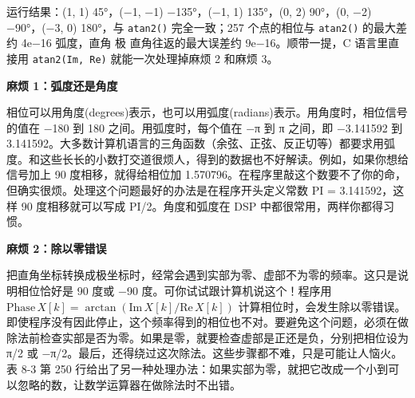 \begin{Shaded}
\begin{Highlighting}[]
 \OperatorTok{(}  \OperatorTok{*}\OperatorTok{,}   \OperatorTok{*}\OperatorTok{,}  \OperatorTok{*}\OperatorTok{,}  \OperatorTok{*}\OperatorTok{)}
\OperatorTok{\{}
     \OperatorTok{(}\OperatorTok{=} \OperatorTok{;}\OperatorTok{\textless{}}\OperatorTok{;}\OperatorTok{++)} \OperatorTok{\{}          
\OperatorTok{[}\OperatorTok{]} \OperatorTok{=}\OperatorTok{[}\OperatorTok{]} \OperatorTok{*}\OperatorTok{(}\OperatorTok{[}\OperatorTok{]);}    
\OperatorTok{[}\OperatorTok{]} \OperatorTok{=}\OperatorTok{[}\OperatorTok{]} \OperatorTok{*}\OperatorTok{(}\OperatorTok{[}\OperatorTok{]);}    
    \OperatorTok{\}}
\OperatorTok{\}}
\end{Highlighting}
\end{Shaded}

运行结果：(1, 1)  45°，(−1, −1)  −135°，(−1, 1)
 135°，(0, 2)  90°，(0, −2)  −90°，(−3, 0)
 180°，与 \texttt{atan2()} 完全一致；257 个点的相位与
\texttt{atan2()} 的最大差约 4e−16 弧度，直角  极 
直角往返的最大误差约 9e−16。顺带一提，C 语言里直接用
\texttt{atan2(Im,\ Re)} 就能一次处理掉麻烦 2 和麻烦 3。

\textbf{麻烦 1：弧度还是角度}

相位可以用角度(degrees)表示，也可以用弧度(radians)表示。用角度时，相位信号的值在
−180 到 180 之间。用弧度时，每个值在 −π 到 π 之间，即 −3.141592 到
3.141592。大多数计算机语言的三角函数（余弦、正弦、反正切等）都要求用弧度。和这些长长的小数打交道很烦人，得到的数据也不好解读。例如，如果你想给信号加上
90 度相移，就得给相位加
1.570796。在程序里敲这个数要不了你的命，但确实很烦。处理这个问题最好的办法是在程序开头定义常数
PI = 3.141592，这样 90 度相移就可以写成 PI/2。角度和弧度在 DSP
中都很常用，两样你都得习惯。

\textbf{麻烦 2：除以零错误}

把直角坐标转换成极坐标时，经常会遇到实部为零、虚部不为零的频率。这只是说明相位恰好是
90 度或 −90 度。可你试试跟计算机说这个！程序用
\(\mathrm{Phase}\,X[k] = \arctan(\mathrm{Im}\,X[k]/\mathrm{Re}\,X[k])\)
计算相位时，会发生除以零错误。即使程序没有因此停止，这个频率得到的相位也不对。要避免这个问题，必须在做除法前检查实部是否为零。如果是零，就要检查虚部是正还是负，分别把相位设为
π/2 或
−π/2。最后，还得绕过这次除法。这些步骤都不难，只是可能让人恼火。表 8-3
第 250
行给出了另一种处理办法：如果实部为零，就把它改成一个小到可以忽略的数，让数学运算器在做除法时不出错。

